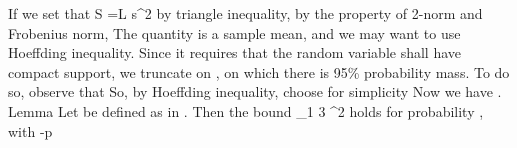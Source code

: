 If we set that
 {
\NC S
=\NC L s^2 \NR
}
by triangle inequality, by the property of 2-norm and Frobenius norm,
%
%
The quantity  is a sample mean, and we may want to use Hoeffding inequality.
Since it requires that the random variable shall have compact support, we truncate  on , on which there is 95\% probability mass.
%
To do so, observe that
%
So, by Hoeffding inequality, choose for simplicity
%
 {
\NC {} 
\leq {} \exp {} \NR
}
%
Now we have .
%
\Result
{Lemma}
{
Let  be defined as in .
Then the bound
%
 {
\NC {} _1
\leq \NC {} {3} ^2 \NR
}
%
holds for probability , with
%
 {
 -p
\leq {} \exp {} \NR
}
}

\stopsubsection
\stopsection

